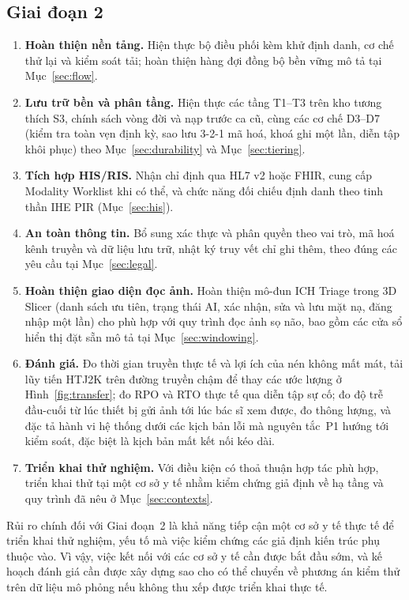 \subsection{Giai đoạn 2}

\begin{enumerate}
    \item \textbf{Hoàn thiện nền tảng.} Hiện thực bộ điều phối kèm khử định
          danh, cơ chế thử lại và kiểm soát tải; hoàn thiện hàng đợi đồng bộ bền
vững mô tả tại Mục~\ref{sec:flow}.
\item \textbf{Lưu trữ bền và phân tầng.} Hiện thực các tầng T1--T3 trên kho
      tương thích S3, chính sách vòng đời và nạp trước ca cũ, cùng các cơ chế
      D3--D7 (kiểm tra toàn vẹn định kỳ, sao lưu 3-2-1 mã hoá, khoá ghi một lần,
      diễn tập khôi phục) theo Mục~\ref{sec:durability} và Mục~\ref{sec:tiering}.
\item \textbf{Tích hợp HIS/RIS.} Nhận chỉ định qua HL7 v2 hoặc FHIR, cung cấp
      Modality Worklist khi có thể, và chức năng đối chiếu định danh theo tinh
      thần IHE PIR (Mục~\ref{sec:his}).
    \item \textbf{An toàn thông tin.} Bổ sung xác thực và phân quyền theo vai
          trò, mã hoá kênh truyền và dữ liệu lưu trữ, nhật ký truy vết chỉ ghi
          thêm, theo đúng các yêu cầu tại Mục~\ref{sec:legal}.
    \item \textbf{Hoàn thiện giao diện đọc ảnh.} Hoàn thiện mô-đun ICH Triage
          trong 3D Slicer (danh sách ưu tiên, trạng thái AI, xác nhận, sửa và lưu
          mặt nạ, đăng nhập một lần) cho phù hợp với quy trình đọc ảnh sọ não,
          bao gồm các cửa sổ hiển thị đặt sẵn mô tả tại Mục~\ref{sec:windowing}.
    \item \textbf{Đánh giá.} Đo thời gian truyền thực tế và lợi ích của nén không mất
      mát, tải lũy tiến HTJ2K trên đường truyền chậm để thay các ước lượng ở
      Hình~\ref{fig:transfer}; đo RPO và RTO thực tế qua diễn tập sự cố; đo độ trễ đầu-cuối từ lúc thiết bị gửi ảnh tới lúc
          bác sĩ xem được, đo thông lượng, và đặc tả hành vi hệ thống dưới các
          kịch bản lỗi mà nguyên tắc~P1 hướng tới kiểm soát, đặc biệt là kịch
          bản mất kết nối kéo dài.
    \item \textbf{Triển khai thử nghiệm.} Với điều kiện có thoả thuận hợp tác
          phù hợp, triển khai thử tại một cơ sở y tế nhằm kiểm chứng giả định về
          hạ tầng và quy trình đã nêu ở Mục~\ref{sec:contexts}.
\end{enumerate}

Rủi ro chính đối với Giai đoạn~2 là khả năng tiếp cận một cơ sở y tế thực tế để
triển khai thử nghiệm, yếu tố mà việc kiểm chứng các giả định kiến trúc phụ
thuộc vào. Vì vậy, việc kết nối với các cơ sở y tế cần được bắt đầu sớm, và kế
hoạch đánh giá cần được xây dựng sao cho có thể chuyển về phương án kiểm thử
trên dữ liệu mô phỏng nếu không thu xếp được triển khai thực tế.
